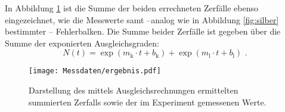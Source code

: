In Abbildung \ref{fig:ergebnis} ist die Summe der beiden errechneten Zerfälle ebenso eingezeichnet, wie die Messwerte samt --analog wie in Abbildung \ref{fig:silber} bestimmter -- Fehlerbalken.
Die Summe beider Zerfälle ist gegeben über die Summe der exponierten Ausgleichsgraden:
\begin{equation*}
	N(t)=\exp{(m_\mathrm{k}\cdot t+b_\mathrm{k})}+ \exp{(m_\mathrm{l}\cdot t+b_\mathrm{l})}\text{ .}
\end{equation*}


\begin{figure}
  \centering
  \texttt{[image: Messdaten/ergebnis.pdf]}
  \caption{Darstellung des mittels Ausgleichsrechnungen ermittelten summierten Zerfalls sowie der im Experiment gemessenen Werte.}
  \label{fig:ergebnis}
\end{figure}




